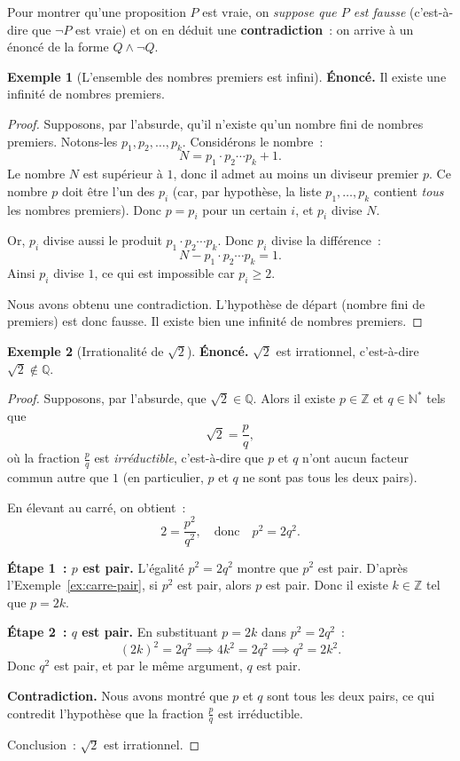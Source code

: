 \documentclass[12pt,a4paper,openany]{book}
\theoremstyle{definition}
\newtheorem{exemple}{Exemple}[chapter]
\newcommand{\N}{\mathbb{N}}
\newcommand{\Z}{\mathbb{Z}}
\newcommand{\Q}{\mathbb{Q}}
\begin{document}
Pour montrer qu'une proposition $P$ est vraie, on \emph{suppose que $P$ est fausse} (c'est-à-dire que $\lnot P$ est vraie) et on en déduit une \textbf{contradiction}~: on arrive à un énoncé de la forme $Q \land \lnot Q$.

\begin{exemple}[L'ensemble des nombres premiers est infini]\label{ex:premiers-infini}
  \textbf{Énoncé.} Il existe une infinité de nombres premiers.

  \begin{proof}
    Supposons, par l'absurde, qu'il n'existe qu'un nombre fini de nombres premiers. Notons-les $p_1, p_2, \ldots, p_k$. Considérons le nombre~:
    \[
      N = p_1 \cdot p_2 \cdots p_k + 1.
    \]
    Le nombre $N$ est supérieur à $1$, donc il admet au moins un diviseur premier $p$. Ce nombre $p$ doit être l'un des $p_i$ (car, par hypothèse, la liste $p_1, \ldots, p_k$ contient \emph{tous} les nombres premiers). Donc $p = p_i$ pour un certain $i$, et $p_i$ divise $N$.

    Or, $p_i$ divise aussi le produit $p_1 \cdot p_2 \cdots p_k$. Donc $p_i$ divise la différence~:
    \[
      N - p_1 \cdot p_2 \cdots p_k = 1.
    \]
    Ainsi $p_i$ divise $1$, ce qui est impossible car $p_i \geq 2$.

    Nous avons obtenu une contradiction. L'hypothèse de départ (nombre fini de premiers) est donc fausse. Il existe bien une infinité de nombres premiers.
  \end{proof}
\end{exemple}

\begin{exemple}[Irrationalité de $\sqrt{2}$]\label{ex:sqrt2}
  \textbf{Énoncé.} $\sqrt{2}$ est irrationnel, c'est-à-dire $\sqrt{2} \notin \Q$.

  \begin{proof}
    Supposons, par l'absurde, que $\sqrt{2} \in \Q$. Alors il existe $p \in \Z$ et $q \in \N^*$ tels que
    \[
      \sqrt{2} = \frac{p}{q},
    \]
    où la fraction $\frac{p}{q}$ est \emph{irréductible}, c'est-à-dire que $p$ et $q$ n'ont aucun facteur commun autre que $1$ (en particulier, $p$ et $q$ ne sont pas tous les deux pairs).

    En élevant au carré, on obtient~:
    \[
      2 = \frac{p^2}{q^2}, \quad \text{donc} \quad p^2 = 2q^2.
    \]

    \textbf{Étape 1~: $p$ est pair.} L'égalité $p^2 = 2q^2$ montre que $p^2$ est pair. D'après l'Exemple~\ref{ex:carre-pair}, si $p^2$ est pair, alors $p$ est pair. Donc il existe $k \in \Z$ tel que $p = 2k$.

    \textbf{Étape 2~: $q$ est pair.} En substituant $p = 2k$ dans $p^2 = 2q^2$~:
    \[
      (2k)^2 = 2q^2 \implies 4k^2 = 2q^2 \implies q^2 = 2k^2.
    \]
    Donc $q^2$ est pair, et par le même argument, $q$ est pair.

    \textbf{Contradiction.} Nous avons montré que $p$ et $q$ sont tous les deux pairs, ce qui contredit l'hypothèse que la fraction $\frac{p}{q}$ est irréductible.

    Conclusion~: $\sqrt{2}$ est irrationnel.
  \end{proof}
\end{exemple}
\end{document}
